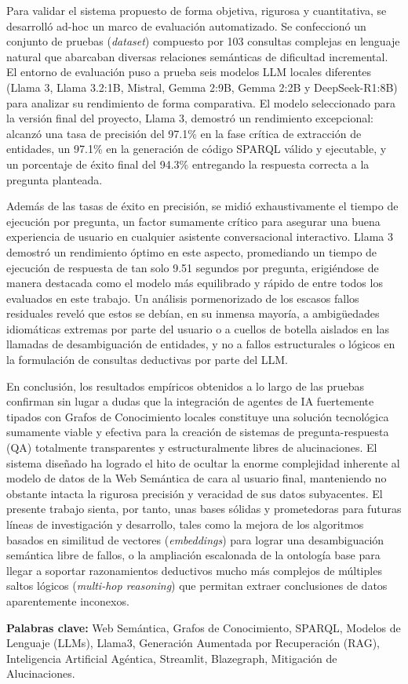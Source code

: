 Para validar el sistema propuesto de forma objetiva, rigurosa y cuantitativa, se desarrolló ad-hoc un marco de evaluación automatizado. Se confeccionó un conjunto de pruebas (\textit{dataset}) compuesto por 103 consultas complejas en lenguaje natural que abarcaban diversas relaciones semánticas de dificultad incremental. El entorno de evaluación puso a prueba seis modelos LLM locales diferentes (Llama 3, Llama 3.2:1B, Mistral, Gemma 2:9B, Gemma 2:2B y DeepSeek-R1:8B) para analizar su rendimiento de forma comparativa. El modelo seleccionado para la versión final del proyecto, Llama 3, demostró un rendimiento excepcional: alcanzó una tasa de precisión del 97.1\% en la fase crítica de extracción de entidades, un 97.1\% en la generación de código SPARQL válido y ejecutable, y un porcentaje de éxito final del 94.3\% entregando la respuesta correcta a la pregunta planteada.

Además de las tasas de éxito en precisión, se midió exhaustivamente el tiempo de ejecución por pregunta, un factor sumamente crítico para asegurar una buena experiencia de usuario en cualquier asistente conversacional interactivo. Llama 3 demostró un rendimiento óptimo en este aspecto, promediando un tiempo de ejecución de respuesta de tan solo 9.51 segundos por pregunta, erigiéndose de manera destacada como el modelo más equilibrado y rápido de entre todos los evaluados en este trabajo. Un análisis pormenorizado de los escasos fallos residuales reveló que estos se debían, en su inmensa mayoría, a ambigüedades idiomáticas extremas por parte del usuario o a cuellos de botella aislados en las llamadas de desambiguación de entidades, y no a fallos estructurales o lógicos en la formulación de consultas deductivas por parte del LLM.

En conclusión, los resultados empíricos obtenidos a lo largo de las pruebas confirman sin lugar a dudas que la integración de agentes de IA fuertemente tipados con Grafos de Conocimiento locales constituye una solución tecnológica sumamente viable y efectiva para la creación de sistemas de pregunta-respuesta (QA) totalmente transparentes y estructuralmente libres de alucinaciones. El sistema diseñado ha logrado el hito de ocultar la enorme complejidad inherente al modelo de datos de la Web Semántica de cara al usuario final, manteniendo no obstante intacta la rigurosa precisión y veracidad de sus datos subyacentes. El presente trabajo sienta, por tanto, unas bases sólidas y prometedoras para futuras líneas de investigación y desarrollo, tales como la mejora de los algoritmos basados en similitud de vectores (\textit{embeddings}) para lograr una desambiguación semántica libre de fallos, o la ampliación escalonada de la ontología base para llegar a soportar razonamientos deductivos mucho más complejos de múltiples saltos lógicos (\textit{multi-hop reasoning}) que permitan extraer conclusiones de datos aparentemente inconexos.

\vspace{1cm}
\textbf{Palabras clave:} Web Semántica, Grafos de Conocimiento, SPARQL, Modelos de Lenguaje (LLMs), Llama3, Generación Aumentada por Recuperación (RAG), Inteligencia Artificial Agéntica, Streamlit, Blazegraph, Mitigación de Alucinaciones.
